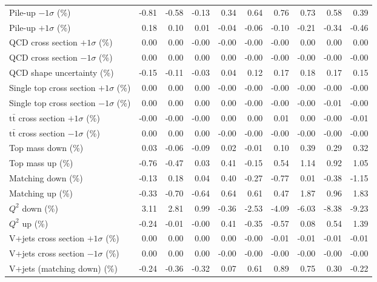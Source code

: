 \begin{table}[htbp]
{\begin{tabular}{lrrrrrrrrr}
Pile-up $-1\sigma$ (\%) & -0.81 & -0.58 & -0.13 & 0.34 & 0.64 & 0.76 & 0.73 & 0.58 & 0.39 \\ 
Pile-up $+1\sigma$ (\%) & 0.18 & 0.10 & 0.01 & -0.04 & -0.06 & -0.10 & -0.21 & -0.34 & -0.46 \\ 
QCD cross section \ensuremath{+1\sigma} (\%) & 0.00 & 0.00 & -0.00 & -0.00 & -0.00 & -0.00 & 0.00 & 0.00 & 0.00 \\ 
QCD cross section \ensuremath{-1\sigma} (\%) & 0.00 & 0.00 & 0.00 & 0.00 & -0.00 & -0.00 & -0.00 & -0.00 & -0.00 \\ 
QCD shape uncertainty (\%) & -0.15 & -0.11 & -0.03 & 0.04 & 0.12 & 0.17 & 0.18 & 0.17 & 0.15 \\ 
Single top cross section $+1\sigma$ (\%) & 0.00 & 0.00 & 0.00 & -0.00 & -0.00 & -0.00 & -0.00 & -0.00 & -0.00 \\ 
Single top cross section $-1\sigma$ (\%) & 0.00 & 0.00 & 0.00 & 0.00 & -0.00 & -0.00 & -0.00 & -0.01 & -0.00 \\ 
$\mathrm{t}\bar{\mathrm{t}}$ cross section $+1\sigma$ (\%) & -0.00 & -0.00 & -0.00 & 0.00 & 0.00 & 0.01 & 0.00 & -0.00 & -0.01 \\ 
$\mathrm{t}\bar{\mathrm{t}}$ cross section $-1\sigma$ (\%) & 0.00 & 0.00 & 0.00 & -0.00 & -0.00 & -0.00 & -0.00 & -0.00 & -0.00 \\ 
Top mass down (\%) & 0.03 & -0.06 & -0.09 & 0.02 & -0.01 & 0.10 & 0.39 & 0.29 & 0.32 \\ 
Top mass up (\%) & -0.76 & -0.47 & 0.03 & 0.41 & -0.15 & 0.54 & 1.14 & 0.92 & 1.05 \\ 
Matching down (\%) & -0.13 & 0.18 & 0.04 & 0.40 & -0.27 & -0.77 & 0.01 & -0.38 & -1.15 \\ 
Matching up (\%) & -0.33 & -0.70 & -0.64 & 0.64 & 0.61 & 0.47 & 1.87 & 0.96 & 1.83 \\ 
$Q^{2}$ down (\%) & 3.11 & 2.81 & 0.99 & -0.36 & -2.53 & -4.09 & -6.03 & -8.38 & -9.23 \\ 
$Q^{2}$ up (\%) & -0.24 & -0.01 & -0.00 & 0.41 & -0.35 & -0.57 & 0.08 & 0.54 & 1.39 \\ 
V+jets cross section \ensuremath{+1\sigma} (\%) & 0.00 & 0.00 & 0.00 & 0.00 & -0.00 & -0.01 & -0.01 & -0.01 & -0.01 \\ 
V+jets cross section \ensuremath{-1\sigma} (\%) & 0.00 & 0.00 & 0.00 & -0.00 & -0.00 & -0.00 & -0.00 & -0.00 & -0.00 \\ 
V+jets (matching down) (\%) & -0.24 & -0.36 & -0.32 & 0.07 & 0.61 & 0.89 & 0.75 & 0.30 & -0.22 \\ 

\end{tabular}}
\end{table}
